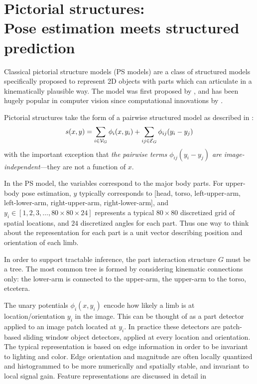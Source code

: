 \chapter{Pictorial structures: \\Pose estimation meets structured prediction} 
\label{sec:ps}
Classical pictorial structure models (PS models) are a class of structured 
models specifically proposed to represent 2D objects with parts which can 
articulate in a kinematically plausible way.  The model was first proposed by 
\citet{fischler1973ps}, and has been hugely popular in computer vision since 
computational innovations by \citet{felz05}.

Pictorial structures take the form of a pairwise structured model as described 
in :
\begin{equation}
s(x,y) = \sum_{i \in \mathcal{V}_G} \phi_i(x,y_i) + \sum_{ij \in \mathcal{E}_G} 
\label{eq:standard-ps}
\phi_{ij}(y_i-y_j)
\end{equation}
with the important exception that {\em the pairwise terms $\phi_{ij}(y_i-y_j)$ 
are image-independent}---they are not a function of $x$.

In the PS model, the variables correspond to the major body parts.  For 
upper-body pose estimation, $y$ typically corresponds to [head, torso, 
left-upper-arm, left-lower-arm, right-upper-arm, right-lower-arm], and $y_i \in 
[1,2,3,\ldots,80\times 80 \times 24]$ represents a typical $80 \times 80$ 
discretized grid of spatial locations, and $24$ discretized angles for each 
part.  Thus one way to think about the representation for each part is a unit 
vector describing position and orientation of each limb. 

 In order to support tractable inference, the part 
interaction structure $G$ must be a tree.  The most common tree is formed by 
considering kinematic connections only: the lower-arm is connected to the 
upper-arm, the upper-arm to the torso, etcetera.

 The unary potentials $\phi_i(x,y_i)$ encode how 
likely a limb is at location/orientation $y_i$ in the image.  This can be 
thought of as a part detector applied to an image patch located at $y_i$.  In 
practice these detectors are patch-based sliding window object detectors, 
applied at every location and orientation.  The typical representation is based 
on edge information in order to be invariant to lighting and color. Edge 
orientation and magnitude are often locally quantized and histogrammed to be 
more numerically and spatially stable, and invariant to local signal gain.  
Feature representations are discussed in detail in 

